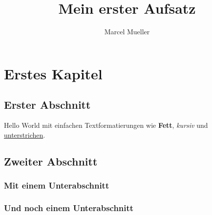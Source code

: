 \documentclass[12pt,a4paper,final,twoside]{scrreprt}
\author{Marcel Mueller}
\title{Mein erster Aufsatz}
\begin{document}
	\chapter{Erstes Kapitel}
	\section{Erster Abschnitt}
	Hello World mit einfachen Textformatierungen wie \textbf{Fett}, \textit{kursiv} und \underline{unterstrichen}. 
	\section{Zweiter Abschnitt}
	\blindtext
	\subsection{Mit einem Unterabschnitt}
	\blindtext
	\subsection{Und noch einem Unterabschnitt}
	\blindtext
	\blindtext
	\blindtext
	\blindtext
	\blindtext
	\blindtext
	\blindtext
	\blindtext
	\blindtext
	\blindtext
	\blindtext
	\blindtext
\end{document}
